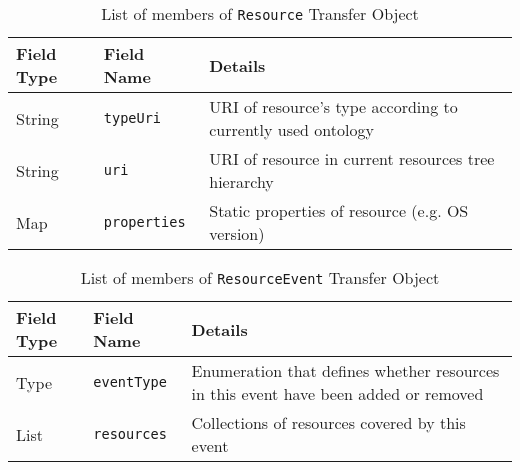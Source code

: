\begin{table}[ht] %
\begin{tabular}{| m{} | m{} | m{} | }
\hline 
\cellcolor[gray]{0.9} Field Type & \cellcolor[gray]{0.9} Field Name & \cellcolor[gray]{0.9} Details \\
\hline
String & \texttt{typeUri} & URI of resource\rq{}s type according to currently used ontology \\
String & \texttt{uri} & URI of resource in current resources tree hierarchy \\
Map & \texttt{properties} & Static properties of resource (e.g. OS version) \\
\hline 
\end{tabular}
\caption{List of members of \texttt{Resource} Transfer Object}
\label{tab:TO_Resource}
\end{table} %

\begin{table}[ht] %
\begin{tabular}{| m{} | m{} | m{} | }
\hline 
\cellcolor[gray]{0.9} Field Type & \cellcolor[gray]{0.9} Field Name & \cellcolor[gray]{0.9} Details \\
\hline
Type & \texttt{eventType} & Enumeration that defines whether resources in this event have been added or removed \\
List & \texttt{resources} & Collections of resources covered by this event \\
\hline 
\end{tabular}
\caption{List of members of \texttt{ResourceEvent} Transfer Object}
\label{tab:TO_ResourceEvent}
\end{table} %
\renewcommand*\arraystretch{1}

